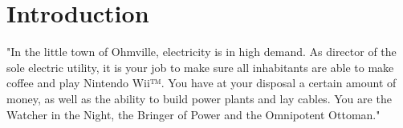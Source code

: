 \section{Introduction}
"In the little town of Ohmville, electricity is in high demand. As director of the sole electric 
utility, it is your job to make sure all inhabitants are able to make coffee and play Nintendo Wii™. 
You have at your disposal a certain amount of money, as well as the ability to build power plants 
and lay cables. You are the Watcher in the Night, the Bringer of Power and the Omnipotent Ottoman."